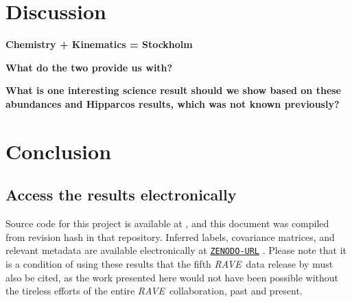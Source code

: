 \documentclass[preprint,trackchanges]{aastex}
\newcommand{\acronym}[1]{{\small{#1}}}
\newcommand{\project}[1]{\textsl{#1}}
\newcommand{\rave}{\project{\acronym{RAVE}}}
\newcommand{\stub}[1]{{\color{blue} \textbf{#1}}}
\newcommand{\teff}{T_{\mathrm{eff}}}
\newcommand{\logg}{\log g}
\newcommand{\Nstars}{457,589}
\begin{document}
\section{Discussion}
\label{sec:discussion}


\stub{Chemistry + Kinematics = Stockholm}

\stub{What do the two provide us with?}

\stub{What is one interesting science result should we show based on these abundances and Hipparcos results, which was not known previously?}


\section{Conclusion}
\label{sec:conclusion}



\subsection*{Access the results electronically}

\noindent\colorbox{unoffensive-warning}{\parbox{\dimexpr\linewidth-2\fboxsep}{
\noindent{}Source code for this project is available at \texttt{\giturl}\hspace{-0.5em},
and this document was compiled from revision hash \texttt{\githash} in that repository.
Inferred labels, covariance matrices, and relevant metadata are available electronically
at \texttt{\url{ZENODO-URL}} \citep{DATA_REPOSITORY}.  Please note that it is a condition
of using these results that the fifth \rave\ data release by \citet{Kunder_2016} must 
also be cited, as the work presented here would not have been possible without the 
tireless efforts of the entire \rave\ collaboration, past and present.
}}
\end{document}
